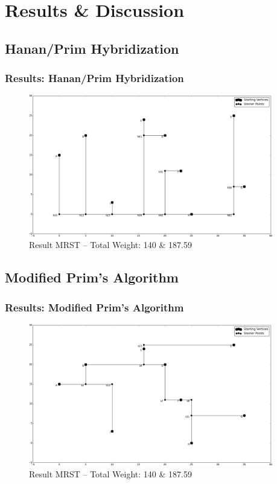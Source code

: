 \documentclass{beamer}
\begin{document}
\section{Results \& Discussion}

\subsection{Hanan/Prim Hybridization}
\begin{frame}
\frametitle{Results: Hanan/Prim Hybridization}
 \begin{figure}[htbp!]
 	\vspace{-5pt}
 	\centering
	\includegraphics[width=0.95\textwidth]{NaiveResult}
	\caption{Result MRST -- Total Weight: 140 \& 187.59} 
	\label{naiveresult_image}
\end{figure}
\end{frame}

\subsection{Modified Prim's Algorithm}
\begin{frame}
\frametitle{Results: Modified Prim's Algorithm}
 \begin{figure}[htbp!]
 	\vspace{-5pt}
 	\centering
	\includegraphics[width=0.95\textwidth]{SmarterResult}
	\caption{Result MRST -- Total Weight: 140 \& 187.59} 
	\label{naiveresult_image}
\end{figure}
\end{frame}
\end{document}
